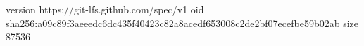 version https://git-lfs.github.com/spec/v1
oid sha256:a09c89f3aeeedc6dc435f40423c82a8acedf653008c2de2bf07ecefbe59b02ab
size 87536
